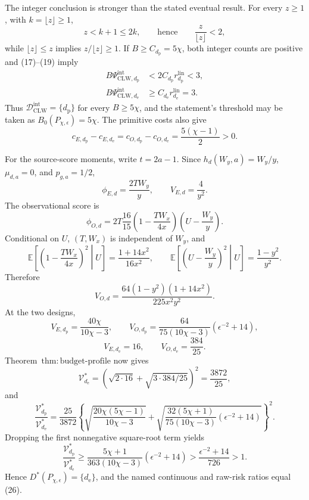 The integer conclusion is stronger than the stated eventual result.  For every \(z\ge1\), with \(k=\lfloor z\rfloor\ge1\),
\[
 z<k+1\le2k,
 \qquad\text{hence}\qquad \frac z{\lfloor z\rfloor}<2,   \tag{19}
\]
while \(\lfloor z\rfloor\le z\) implies \(z/\lfloor z\rfloor\ge1\).  If \(B\ge C_{d_{\mathrm p}}=5\chi\), both integer counts are positive and (17)--(19) imply
\[
\begin{aligned}
 B\Psi_{\mathrm{CLW},d_{\mathrm p}}^{\mathrm{int}}
 &<2C_{d_{\mathrm p}}r_{d_{\mathrm p}}^{\mathrm{lin}}<3,\\
 B\Psi_{\mathrm{CLW},d_{\mathrm e}}^{\mathrm{int}}
 &\ge C_{d_{\mathrm e}}r_{d_{\mathrm e}}^{\mathrm{lin}}=3.
\end{aligned}                                               \tag{20}
\]
Thus \(\mathcal D_{\mathrm{CLW}}^{\mathrm{int}}=\{d_{\mathrm p}\}\) for every \(B\ge5\chi\), and the statement's threshold may be taken as \(B_0(P_{\chi,\epsilon})=5\chi\).  The primitive costs also give
\[
 c_{E,d_{\mathrm p}}-c_{E,d_{\mathrm e}}
 =c_{O,d_{\mathrm p}}-c_{O,d_{\mathrm e}}
 =\frac{5(\chi-1)}2>0.                                    \tag{21}
\]

For the source-score moments, write \(t=2a-1\).  Since \(h_d(W_y,a)=W_y/y\), \(\mu_{d,a}=0\), and \(p_{g,a}=1/2\),
\[
 \phi_{E,d}=\frac{2TW_y}{y},
 \qquad V_{E,d}=\frac4{y^2}.                              \tag{22}
\]
The observational score is
\[
 \phi_{O,d}=2T\frac{16}{15}
 \left(1-\frac{TW_x}{4x}\right)
 \left(U-\frac{W_y}{y}\right).
\]
Conditional on \(U\), \((T,W_x)\) is independent of \(W_y\), and
\[
 \mathbb E\!\left[\left(1-\frac{TW_x}{4x}\right)^2\middle|U\right]
 =\frac{1+14x^2}{16x^2},
 \qquad
 \mathbb E\!\left[\left(U-\frac{W_y}{y}\right)^2\middle|U\right]
 =\frac{1-y^2}{y^2}.
\]
Therefore
\[
 V_{O,d}=\frac{64(1-y^2)(1+14x^2)}{225x^2y^2}.             \tag{23}
\]
At the two designs,
\[
 V_{E,d_{\mathrm p}}=\frac{40\chi}{10\chi-3},
 \qquad
 V_{O,d_{\mathrm p}}=
 \frac{64}{75(10\chi-3)}(\epsilon^{-2}+14),              \tag{24}
\]
\[
 V_{E,d_{\mathrm e}}=16,
 \qquad V_{O,d_{\mathrm e}}=\frac{384}{25}.
\]
Theorem~\(\mathrm{thm{:}budget\text{-}profile}\) now gives
\[
 \mathcal V_{d_{\mathrm e}}^*
 =\left(\sqrt{2\cdot16}+\sqrt{3\cdot384/25}\right)^2
 =\frac{3872}{25},                                        \tag{25}
\]
and
\[
 \frac{\mathcal V_{d_{\mathrm p}}^*}{\mathcal V_{d_{\mathrm e}}^*}
 =\frac{25}{3872}
 \left\{
 \sqrt{\frac{20\chi(5\chi-1)}{10\chi-3}}
 +\sqrt{\frac{32(5\chi+1)}{75(10\chi-3)}
 (\epsilon^{-2}+14)}
 \right\}^{2}.                                            \tag{26}
\]
Dropping the first nonnegative square-root term yields
\[
 \frac{\mathcal V_{d_{\mathrm p}}^*}{\mathcal V_{d_{\mathrm e}}^*}
 \ge\frac{5\chi+1}{363(10\chi-3)}(\epsilon^{-2}+14)
 >\frac{\epsilon^{-2}+14}{726}>1.                         \tag{27}
\]
Hence \(D^*(P_{\chi,\epsilon})=\{d_{\mathrm e}\}\), and the named continuous and raw-risk ratios equal (26).

